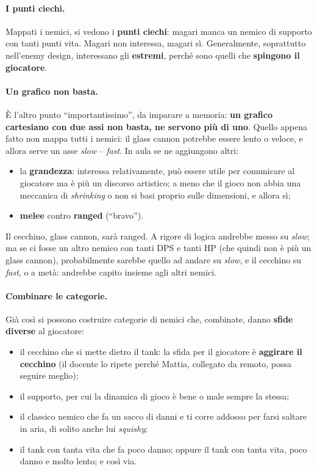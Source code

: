 \paragraph{I punti ciechi.} Mappati i nemici, si vedono i \textbf{punti
ciechi}: magari manca un nemico di supporto con tanti punti vita. Magari non
interessa, magari sì. Generalmente, soprattutto nell'enemy design,
interessano gli \textbf{estremi}, perché sono quelli che \textbf{spingono il
giocatore}.

\paragraph{Un grafico non basta.} È l'altro punto ``importantissimo'', da
imparare a memoria: \textbf{un grafico cartesiano con due assi non basta, ne
servono più di uno}. Quello appena fatto non mappa tutti i nemici: il glass
cannon potrebbe essere lento o veloce, e allora serve un asse \emph{slow} --
\emph{fast}. In aula se ne aggiungono altri:
\begin{itemize}
  \item la \textbf{grandezza}: interessa relativamente, può essere utile per
        comunicare al giocatore ma è più un discorso artistico; a meno che il
        gioco non abbia una meccanica di \emph{shrinking} o non si basi
        proprio sulle dimensioni, e allora sì;
  \item \textbf{melee} contro \textbf{ranged} (``bravo'').
\end{itemize}
Il cecchino, glass cannon, sarà ranged. A rigore di logica andrebbe messo su
\emph{slow}; ma se ci fosse un altro nemico con tanti DPS e tanti HP (che
quindi non è più un glass cannon), probabilmente sarebbe quello ad andare su
\emph{slow}, e il cecchino su \emph{fast}, o a metà: andrebbe capito insieme
agli altri nemici.

\paragraph{Combinare le categorie.} Già così si possono costruire categorie di
nemici che, combinate, danno \textbf{sfide diverse} al giocatore:
\begin{itemize}
  \item il cecchino che si mette dietro il tank: la sfida per il giocatore è
        \textbf{aggirare il cecchino} (il docente lo ripete perché Mattia,
        collegato da remoto, possa seguire meglio);
  \item il supporto, per cui la dinamica di gioco è bene o male sempre la
        stessa;
  \item il classico nemico che fa un sacco di danni e ti corre addosso per
        farsi saltare in aria, di solito anche lui \emph{squishy};
  \item il tank con tanta vita che fa poco danno; oppure il tank con tanta
        vita, poco danno e molto lento; e così via.
\end{itemize}

